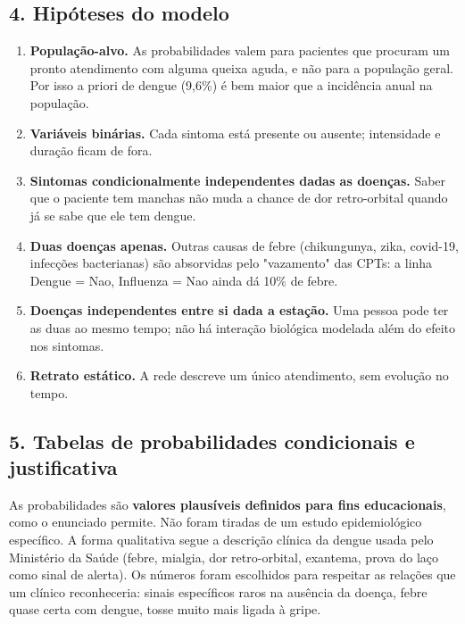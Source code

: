 \documentclass[12pt, a4paper]{article}
\providecommand{\tightlist}{%
  \setlength{\itemsep}{0pt}\setlength{\parskip}{0pt}}
\begin{document}
\subsection{4. Hipóteses do modelo}\label{4-hipuxf3teses-do-modelo}

\begin{enumerate}
\def\labelenumi{\arabic{enumi}.}
\tightlist
\item
  \textbf{População-alvo.} As probabilidades valem para pacientes que procuram um pronto atendimento com alguma queixa aguda, e não para a população geral. Por isso a priori de dengue (9,6\%) é bem maior que a incidência anual na população.
\item
  \textbf{Variáveis binárias.} Cada sintoma está presente ou ausente; intensidade e duração ficam de fora.
\item
  \textbf{Sintomas condicionalmente independentes dadas as doenças.} Saber que o paciente tem manchas não muda a chance de dor retro-orbital quando já se sabe que ele tem dengue.
\item
  \textbf{Duas doenças apenas.} Outras causas de febre (chikungunya, zika, covid-19, infecções bacterianas) são absorvidas pelo "vazamento" das CPTs: a linha Dengue = Nao, Influenza = Nao ainda dá 10\% de febre.
\item
  \textbf{Doenças independentes entre si dada a estação.} Uma pessoa pode ter as duas ao mesmo tempo; não há interação biológica modelada além do efeito nos sintomas.
\item
  \textbf{Retrato estático.} A rede descreve um único atendimento, sem evolução no tempo.
\end{enumerate}

\subsection{5. Tabelas de probabilidades condicionais e justificativa}\label{5-tabelas-de-probabilidades-condicionais-e-justificativa}

As probabilidades são \textbf{valores plausíveis definidos para fins educacionais}, como o enunciado permite. Não foram tiradas de um estudo epidemiológico específico. A forma qualitativa segue a descrição clínica da dengue usada pelo Ministério da Saúde (febre, mialgia, dor retro-orbital, exantema, prova do laço como sinal de alerta). Os números foram escolhidos para respeitar as relações que um clínico reconheceria: sinais específicos raros na ausência da doença, febre quase certa com dengue, tosse muito mais ligada à gripe.
\end{document}
